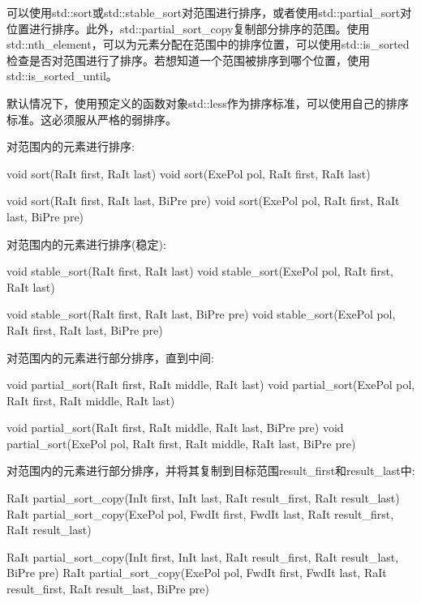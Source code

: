 可以使用std::sort或std::stable\_sort对范围进行排序，或者使用std::partial\_sort对位置进行排序。此外，std::partial\_sort\_copy复制部分排序的范围。使用std::nth\_element，可以为元素分配在范围中的排序位置，可以使用std::is\_sorted检查是否对范围进行了排序。若想知道一个范围被排序到哪个位置，使用std::is\_sorted\_until。

默认情况下，使用预定义的函数对象std::less作为排序标准，可以使用自己的排序标准。这必须服从严格的弱排序。

对范围内的元素进行排序:

\begin{cpp}
void sort(RaIt first, RaIt last)
void sort(ExePol pol, RaIt first, RaIt last)

void sort(RaIt first, RaIt last, BiPre pre)
void sort(ExePol pol, RaIt first, RaIt last, BiPre pre)
\end{cpp}

对范围内的元素进行排序(稳定):

\begin{cpp}
void stable_sort(RaIt first, RaIt last)
void stable_sort(ExePol pol, RaIt first, RaIt last)

void stable_sort(RaIt first, RaIt last, BiPre pre)
void stable_sort(ExePol pol, RaIt first, RaIt last, BiPre pre)
\end{cpp}

对范围内的元素进行部分排序，直到中间:

\begin{cpp}
void partial_sort(RaIt first, RaIt middle, RaIt last)
void partial_sort(ExePol pol, RaIt first, RaIt middle, RaIt last)

void partial_sort(RaIt first, RaIt middle, RaIt last, BiPre pre)
void partial_sort(ExePol pol, RaIt first, RaIt middle, RaIt last, BiPre pre)
\end{cpp}

对范围内的元素进行部分排序，并将其复制到目标范围result\_first和result\_last中:

\begin{cpp}
RaIt partial_sort_copy(InIt first, InIt last,
					   RaIt result_first, RaIt result_last)
RaIt partial_sort_copy(ExePol pol, FwdIt first, FwdIt last,
					   RaIt result_first, RaIt result_last)

RaIt partial_sort_copy(InIt first, InIt last,
					   RaIt result_first, RaIt result_last, BiPre pre)
RaIt partial_sort_copy(ExePol pol, FwdIt first, FwdIt last,
					   RaIt result_first, RaIt result_last, BiPre pre)
\end{cpp}

